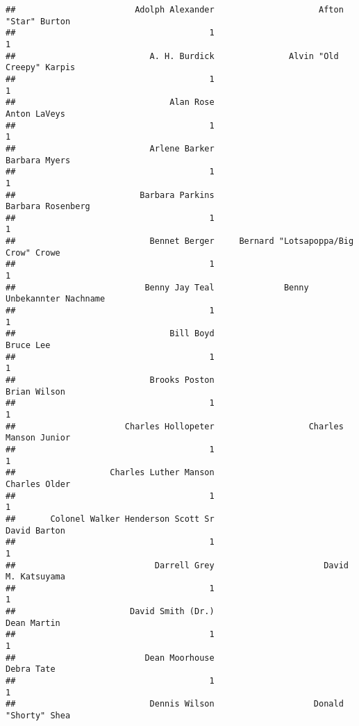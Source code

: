 \documentclass[
]{article}
\begin{document}
\begin{verbatim}
##                        Adolph Alexander                     Afton "Star" Burton 
##                                       1                                       1 
##                           A. H. Burdick               Alvin "Old Creepy" Karpis 
##                                       1                                       1 
##                               Alan Rose                            Anton LaVeys 
##                                       1                                       1 
##                           Arlene Barker                           Barbara Myers 
##                                       1                                       1 
##                         Barbara Parkins                       Barbara Rosenberg 
##                                       1                                       1 
##                           Bennet Berger     Bernard "Lotsapoppa/Big Crow" Crowe 
##                                       1                                       1 
##                          Benny Jay Teal              Benny Unbekannter Nachname 
##                                       1                                       1 
##                               Bill Boyd                               Bruce Lee 
##                                       1                                       1 
##                           Brooks Poston                            Brian Wilson 
##                                       1                                       1 
##                      Charles Hollopeter                   Charles Manson Junior 
##                                       1                                       1 
##                   Charles Luther Manson                           Charles Older 
##                                       1                                       1 
##       Colonel Walker Henderson Scott Sr                            David Barton 
##                                       1                                       1 
##                            Darrell Grey                      David M. Katsuyama 
##                                       1                                       1 
##                       David Smith (Dr.)                             Dean Martin 
##                                       1                                       1 
##                          Dean Moorhouse                              Debra Tate 
##                                       1                                       1 
##                           Dennis Wilson                    Donald "Shorty" Shea 

\end{verbatim}
\end{document}
